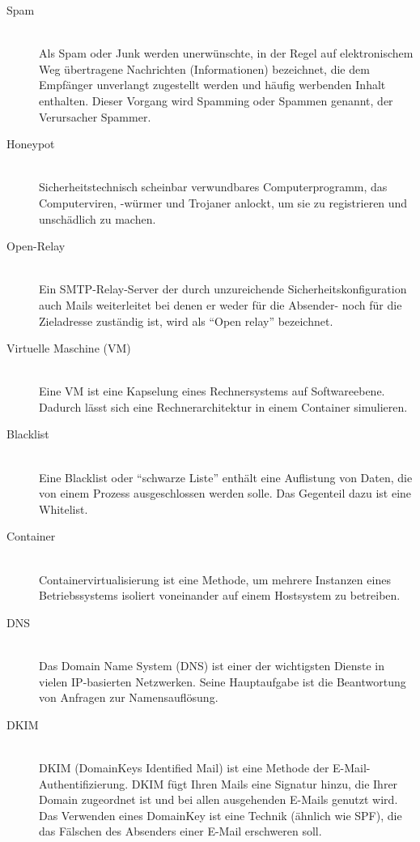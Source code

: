 \documentclass[a4paper,11pt,singlespacing]{article}
\begin{document}
	\begin{description}
	\item[Spam\label{itm:Spam}]\hfill \\
		Als Spam oder Junk werden unerwünschte, in der Regel auf elektronischem Weg übertragene Nachrichten (Informationen) bezeichnet, die dem Empfänger unverlangt zugestellt werden und häufig werbenden Inhalt enthalten. Dieser Vorgang wird Spamming oder Spammen genannt, der Verursacher Spammer.\cite{Spam}
	\item[Honeypot\label{itm:Honeypot}]\hfill \\
		Sicherheitstechnisch scheinbar verwundbares Computerprogramm, das Computerviren, -würmer und Trojaner anlockt, um sie zu registrieren und unschädlich zu machen.\cite{Honeypot}
	\item[Open-Relay\label{itm:OpenRelay}]\hfill \\
		Ein SMTP-Relay-Server der durch unzureichende Sicherheitskonfiguration auch Mails weiterleitet bei denen er weder für die Absender- noch für die Zieladresse zuständig ist, wird als "`Open relay"' bezeichnet.\cite{SMTP-Relay-Server}
	\item[Virtuelle Maschine (VM)\label{itm:VirtuelleMaschine}]\hfill \\
		Eine VM ist eine Kapselung eines Rechnersystems auf Softwareebene. Dadurch lässt sich eine Rechnerarchitektur in einem Container simulieren. \cite{VM}
	\item[Blacklist \label{itm:Blacklist}]\hfill \\
		Eine Blacklist oder "`schwarze Liste"' enthält eine Auflistung von Daten, die von einem Prozess ausgeschlossen werden solle. Das Gegenteil dazu ist eine Whitelist. \cite{Blacklist}
	\item[Container\label{itm:Container}]\hfill \\
		Containervirtualisierung ist eine Methode, um mehrere Instanzen eines Betriebssystems isoliert voneinander auf einem Hostsystem zu betreiben.\cite{Container}
	\item[DNS\label{itm:DNS}]\hfill \\
		Das Domain Name System (DNS) ist einer der wichtigsten Dienste in vielen IP-basierten Netzwerken. Seine Hauptaufgabe ist die Beantwortung von Anfragen zur Namensauflösung.\cite{DNS}
	\item[DKIM\label{itm:DKIM}]\hfill \\
		DKIM (DomainKeys Identified Mail) ist eine Methode der E-Mail-Authentifizierung. DKIM fügt Ihren Mails eine Signatur hinzu, die Ihrer Domain zugeordnet ist und bei allen ausgehenden E-Mails genutzt wird. Das Verwenden eines DomainKey ist eine Technik (ähnlich wie SPF), die das Fälschen des Absenders einer E-Mail erschweren soll.\cite{DKIM}

\end{description}
\end{document}
